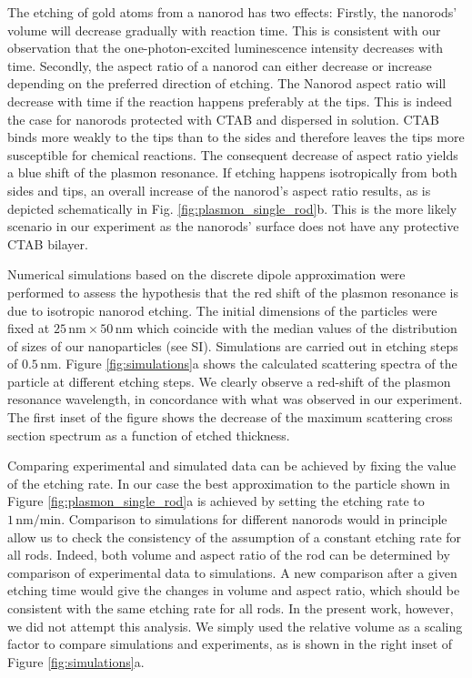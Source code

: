 \documentclass[twoside,twocolumn,11pt]{article}
\newcommand{\nm}{\ensuremath{\,\textrm{nm}}}
\begin{document}
The etching of gold atoms from a nanorod has two effects: Firstly, the nanorods'
volume will decrease gradually with reaction time. This is consistent with our
observation that the one-photon-excited luminescence intensity decreases with
time. Secondly, the aspect ratio of a nanorod can either decrease or increase
depending on the preferred direction of etching. The Nanorod aspect ratio will
decrease with time if the reaction happens preferably at the tips. This is
indeed the case for nanorods protected with CTAB and dispersed in
solution\cite{Jana2002}. CTAB binds more weakly to the tips than to the
sides and therefore leaves the tips more susceptible for chemical
reactions\cite{Caswell2003}. The consequent decrease of aspect ratio yields a
blue shift of the plasmon resonance\cite{Link1999}. If etching
happens isotropically from both sides and tips, an overall increase
of the nanorod's aspect ratio results, as is depicted schematically in Fig.
\ref{fig:plasmon_single_rod}b. This is the more likely scenario in our
experiment as the nanorods' surface does not have any protective CTAB bilayer.

Numerical simulations based on the discrete dipole approximation were performed
to assess the hypothesis that the red shift of the plasmon resonance is 
due to isotropic nanorod etching. The initial dimensions of the
particles were fixed at $25\nm\times50\nm$ which coincide with the median values of the
distribution of sizes of our nanoparticles (see SI). Simulations are carried out
in etching steps of $0.5\nm$. Figure \ref{fig:simulations}a shows the calculated
scattering spectra of the particle at different etching steps. We clearly
observe a red-shift of the plasmon resonance wavelength, in concordance with
what was observed in our experiment. The first inset of the figure shows the
decrease of the maximum scattering cross section spectrum as a function of
etched thickness. 

Comparing experimental and simulated data can be achieved by fixing the value of
the etching rate. In our case the best approximation to the particle shown in
Figure \ref{fig:plasmon_single_rod}a is achieved by setting the etching rate to
$1\nm/\textrm{min}$. Comparison to simulations for different nanorods would in
principle allow us to check the consistency of the assumption of a constant
etching rate for all rods. Indeed, both volume and aspect ratio of the rod can
be determined by comparison of experimental data to simulations.
A new comparison after a given etching time would give the changes in volume and
aspect ratio, which should be consistent with the same etching rate for all
rods. In the present work, however, we did not attempt this analysis. We simply
used the relative volume as a scaling factor to compare simulations and
experiments, as is shown in the right inset of Figure \ref{fig:simulations}a.
\end{document}
